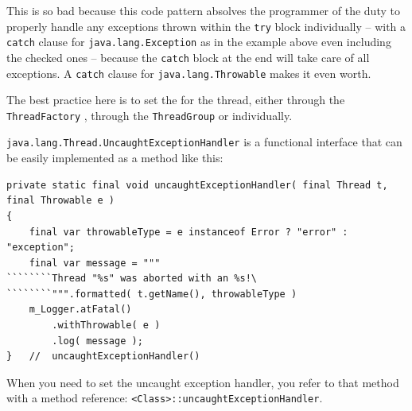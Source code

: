 This is so bad because this code pattern absolves the programmer of the duty to properly handle any exceptions thrown within the \lstinline|try| block individually – with a \lstinline|catch| clause for \lstinline|java.lang.Exception| as in the example above even including the checked ones – because the \lstinline|catch| block at the end will take care of all exceptions. A \lstinline|catch| clause for \lstinline|java.lang.Throwable| makes it even worth.

The best practice here is to set the  \autocite{ORACLE_DOC_UNCAUGHTEXCEPTIONHANDLER_INTERFACE} for the thread, either through the \lstinline|ThreadFactory| \autocite{ORACLE_DOC_THREADFACTORY_INTERFACE}, through the \lstinline|ThreadGroup| \autocite{ORACLE_DOC_THREADGROUP_CLASS} or individually. 

\lstinline|java.lang.Thread.UncaughtExceptionHandler| is a functional interface that can be easily implemented as a method like this:
\begin{lstlisting}[caption=UncaughtExceptionHandler as Method]
private static final void uncaughtExceptionHandler( final Thread t, final Throwable e )
{
    final var throwableType = e instanceof Error ? "error" : "exception";
    final var message = """
````````Thread "%s" was aborted with an %s!\
````````""".formatted( t.getName(), throwableType ) 
    m_Logger.atFatal()
        .withThrowable( e )
        .log( message );    
}   //  uncaughtExceptionHandler()
\end{lstlisting}
When you need to set the uncaught exception handler, you refer to that method with a method reference: \lstinline|<Class>::uncaughtExceptionHandler|.

